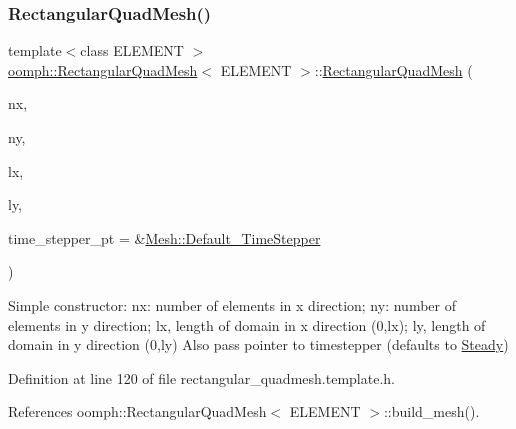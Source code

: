 \subsubsection{\texorpdfstring{Rectangular\+Quad\+Mesh()}{RectangularQuadMesh()}\hspace{0.1cm}{\footnotesize\ttfamily [2/5]}}
{\footnotesize\ttfamily template$<$class E\+L\+E\+M\+E\+NT $>$ \\
\hyperlink{classoomph_1_1RectangularQuadMesh}{oomph\+::\+Rectangular\+Quad\+Mesh}$<$ E\+L\+E\+M\+E\+NT $>$\+::\hyperlink{classoomph_1_1RectangularQuadMesh}{Rectangular\+Quad\+Mesh} (\begin{DoxyParamCaption}\item[{const unsigned \&}]{nx,  }\item[{const unsigned \&}]{ny,  }\item[{const double \&}]{lx,  }\item[{const double \&}]{ly,  }\item[{\hyperlink{classoomph_1_1TimeStepper}{Time\+Stepper} $\ast$}]{time\+\_\+stepper\+\_\+pt = {\ttfamily \&\hyperlink{classoomph_1_1Mesh_a12243d0fee2b1fcee729ee5a4777ea10}{Mesh\+::\+Default\+\_\+\+Time\+Stepper}} }\end{DoxyParamCaption})\hspace{0.3cm}{\ttfamily [inline]}}



Simple constructor\+: nx\+: number of elements in x direction; ny\+: number of elements in y direction; lx, length of domain in x direction (0,lx); ly, length of domain in y direction (0,ly) Also pass pointer to timestepper (defaults to \hyperlink{classoomph_1_1Steady}{Steady}) 



Definition at line 120 of file rectangular\+\_\+quadmesh.\+template.\+h.



References oomph\+::\+Rectangular\+Quad\+Mesh$<$ E\+L\+E\+M\+E\+N\+T $>$\+::build\+\_\+mesh().

\mbox{\label{classoomph_1_1RectangularQuadMesh_aea506679674e4fc5c43b62a53798d0be}} 
